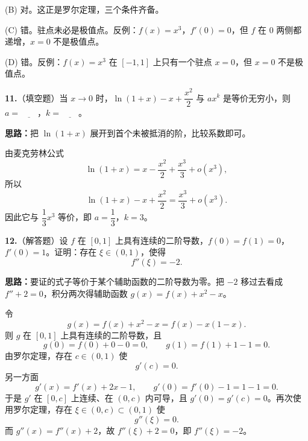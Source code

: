 (B) 对。这正是罗尔定理，三个条件齐备。

(C) 错。驻点未必是极值点。反例：$f(x)=x^{3}$，$f'(0)=0$，但 $f$ 在 $0$ 两侧都递增，$x=0$ 不是极值点。

(D) 错。反例：$f(x)=x^{3}$ 在 $[-1,1]$ 上只有一个驻点 $x=0$，但 $x=0$ 不是极值点。

\else \answerarea[8] \fi%

\textbf{11.}（填空题）当 $x\to 0$ 时，$\ln(1+x)-x+\dfrac{x^{2}}{2}$ 与 $ax^{k}$ 是等价无穷小，则 $a=\underline{\qquad}$，$k=\underline{\qquad}$。

\ifshowsolutions%
\textbf{思路：}把 $\ln(1+x)$ 展开到首个未被抵消的阶，比较系数即可。

由麦克劳林公式
\[
\ln(1+x)=x-\frac{x^{2}}{2}+\frac{x^{3}}{3}+o(x^{3}),
\]
所以
\[
\ln(1+x)-x+\frac{x^{2}}{2}=\frac{x^{3}}{3}+o(x^{3}).
\]
因此它与 $\dfrac13x^{3}$ 等价，即 $a=\dfrac13$，$k=3$。

\else \answerarea[3] \fi%

\textbf{12.}（解答题）设 $f$ 在 $[0,1]$ 上具有连续的二阶导数，$f(0)=f(1)=0$，$f'(0)=1$。证明：存在 $\xi\in(0,1)$，使得
\[
f''(\xi)=-2.
\]

\ifshowsolutions%
\textbf{思路：}要证的式子等价于某个辅助函数的二阶导数为零。把 $-2$ 移过去看成 $f''+2=0$，积分两次得辅助函数 $g(x)=f(x)+x^{2}-x$。

令
\[
g(x)=f(x)+x^{2}-x=f(x)-x(1-x).
\]
则 $g$ 在 $[0,1]$ 上具有连续的二阶导数，且
\[
g(0)=f(0)+0-0=0,\qquad g(1)=f(1)+1-1=0.
\]
由罗尔定理，存在 $c\in(0,1)$ 使
\[
g'(c)=0.
\]
另一方面
\[
g'(x)=f'(x)+2x-1,\qquad g'(0)=f'(0)-1=1-1=0.
\]
于是 $g'$ 在 $[0,c]$ 上连续、在 $(0,c)$ 内可导，且 $g'(0)=g'(c)=0$。再次使用罗尔定理，存在 $\xi\in(0,c)\subset(0,1)$ 使
\[
g''(\xi)=0.
\]
而 $g''(x)=f''(x)+2$，故 $f''(\xi)+2=0$，即 $f''(\xi)=-2$。

\else \answerarea[10] \fi%
